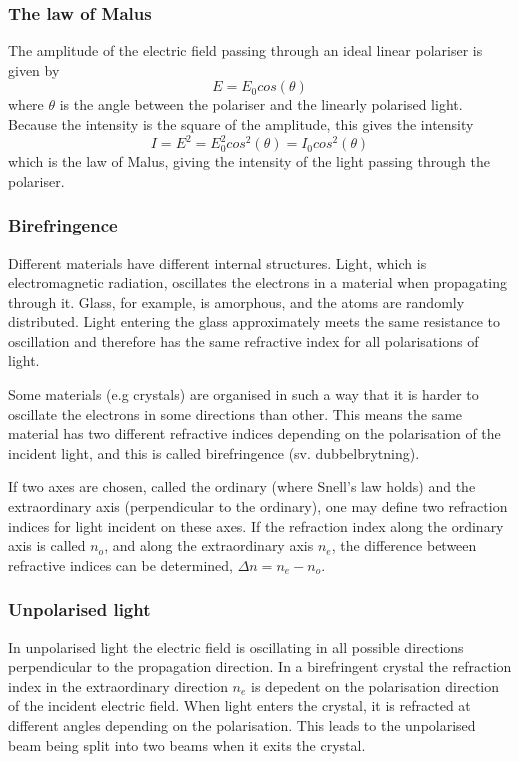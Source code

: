 \documentclass[a4paper]{article}
\begin{document}
\subsubsection{The law of Malus}
The amplitude of the electric field passing through an ideal linear polariser is given by
\begin{equation*}
    E = E_0 cos(\theta)
\end{equation*}
where $\theta$ is the angle between the polariser and the linearly polarised light. Because the intensity is the square of the amplitude, this gives the intensity
\begin{equation*}
    I = E^2 = E_0^2 cos^2(\theta) = I_0 cos^2(\theta)
\end{equation*}
which is the law of Malus, giving the intensity of the light passing through the polariser.

\subsubsection{Birefringence}
Different materials have different internal structures. Light, which is electromagnetic radiation, oscillates the electrons in a material when propagating through it.
Glass, for example, is amorphous, and the atoms are randomly distributed. Light entering the glass approximately meets the same resistance to oscillation and therefore
has the same refractive index for all polarisations of light. 

Some materials (e.g crystals) are organised in such a way that it is harder to oscillate the electrons in
some directions than other. This means the same material has two different refractive indices depending on the polarisation of the incident light, and this is called birefringence
(sv. dubbelbrytning). 

If two axes are chosen, called the ordinary (where Snell's law holds) and the extraordinary axis (perpendicular to the ordinary), one may define two refraction indices for light incident on these
axes. If the refraction index along the ordinary axis is called $n_o$, and along the extraordinary axis $n_e$, the difference between refractive indices can be determined,
$\Delta n = n_e - n_o$.

\subsubsection{Unpolarised light}
In unpolarised light the electric field is oscillating in all possible directions perpendicular to the propagation direction. In a birefringent crystal the refraction index in the 
extraordinary direction $n_e$ is depedent on the polarisation direction of the incident electric field. When light enters the crystal, it is refracted at different angles depending
on the polarisation. This leads to the unpolarised beam being split into two beams when it exits the crystal\cite{wiki}.
\end{document}
